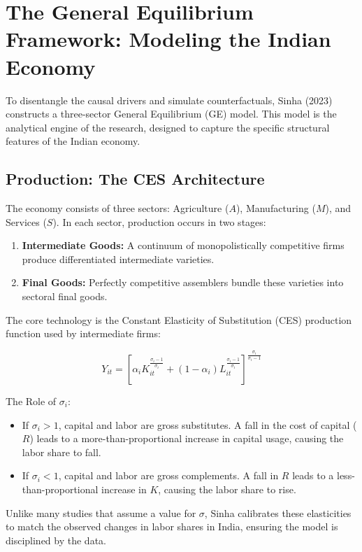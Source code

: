 \documentclass[12pt]{article}
\begin{document}
\newpage
\section{The General Equilibrium Framework: Modeling the Indian Economy}

To disentangle the causal drivers and simulate counterfactuals, Sinha (2023) constructs a three-sector General Equilibrium (GE) model. This model is the analytical engine of the research, designed to capture the specific structural features of the Indian economy.

\subsection{Production: The CES Architecture}
The economy consists of three sectors: Agriculture ($A$), Manufacturing ($M$), and Services ($S$). In each sector, production occurs in two stages:
\begin{enumerate}[leftmargin=*,itemsep=4pt]
\item \textbf{Intermediate Goods:} A continuum of monopolistically competitive firms produce differentiated intermediate varieties.
\item \textbf{Final Goods:} Perfectly competitive assemblers bundle these varieties into sectoral final goods.
\end{enumerate}

The core technology is the Constant Elasticity of Substitution (CES) production function used by intermediate firms:

\[
Y_{it} = \left[ \alpha_i K_{it}^{\frac{\sigma_i-1}{\sigma_i}} + (1-\alpha_i) L_{it}^{\frac{\sigma_i-1}{\sigma_i}} \right]^{\frac{\sigma_i}{\sigma_i-1}}
\]

The Role of $\sigma_i$:
\begin{itemize}[leftmargin=*,itemsep=4pt]
\item If $\sigma_i > 1$, capital and labor are gross substitutes. A fall in the cost of capital ($R$) leads to a more-than-proportional increase in capital usage, causing the labor share to fall.
\item If $\sigma_i < 1$, capital and labor are gross complements. A fall in $R$ leads to a less-than-proportional increase in $K$, causing the labor share to rise.
\end{itemize}

Unlike many studies that assume a value for $\sigma$, Sinha calibrates these elasticities to match the observed changes in labor shares in India, ensuring the model is disciplined by the data.
\end{document}
